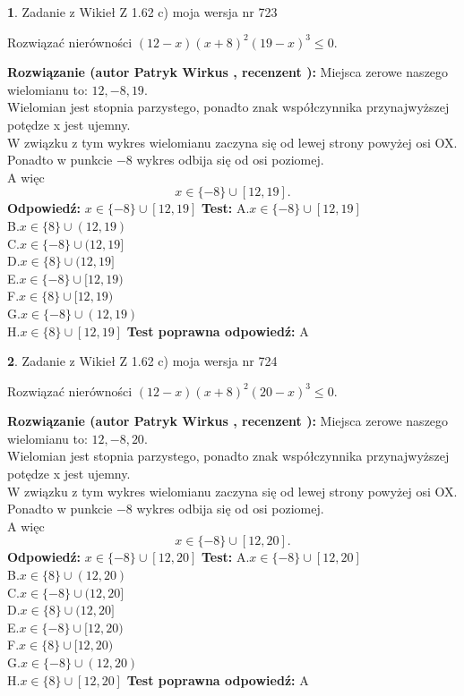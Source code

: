 \documentclass[12pt, a4paper]{article}
\theoremstyle{definition} %
\newtheorem{zad}{}
\newcommand{\zadStart}[1]{\begin{zad}#1\newline}
\newcommand{\zadStop}{\end{zad}}
\newcommand{\rozwStart}[2]{\noindent \textbf{Rozwiązanie (autor #1 , recenzent #2): }\newline}
\newcommand{\rozwStop}{\newline}
\newcommand{\odpStart}{\noindent \textbf{Odpowiedź:}\newline}
\newcommand{\odpStop}{\newline}
\newcommand{\testStart}{\noindent \textbf{Test:}\newline}
\newcommand{\testStop}{\newline}
\newcommand{\kluczStart}{\noindent \textbf{Test poprawna odpowiedź:}\newline}
\newcommand{\kluczStop}{\newline}
\begin{document}
\zadStart{Zadanie z Wikieł Z 1.62 c) moja wersja nr 723}

Rozwiązać nierówności $(12-x)(x+8)^{2}(19-x)^{3}\le0$.
\zadStop
\rozwStart{Patryk Wirkus}{}
Miejsca zerowe naszego wielomianu to: $12, -8, 19$.\\
Wielomian jest stopnia parzystego, ponadto znak współczynnika przy\linebreak najwyższej potędze x jest ujemny.\\ W związku z tym wykres wielomianu zaczyna się od lewej strony powyżej osi OX.\\
Ponadto w punkcie $-8$ wykres odbija się od osi poziomej.\\
A więc $$x \in \{-8\} \cup [12,19].$$
\rozwStop
\odpStart
$x \in \{-8\} \cup [12,19]$
\odpStop
\testStart
A.$x \in \{-8\} \cup [12,19]$\\
B.$x \in \{8\} \cup (12,19)$\\
C.$x \in \{-8\} \cup (12,19]$\\
D.$x \in \{8\} \cup (12,19]$\\
E.$x \in \{-8\} \cup [12,19)$\\
F.$x \in \{8\} \cup [12,19)$\\
G.$x \in \{-8\} \cup (12,19)$\\
H.$x \in \{8\} \cup [12,19]$
\testStop
\kluczStart
A
\kluczStop



\zadStart{Zadanie z Wikieł Z 1.62 c) moja wersja nr 724}

Rozwiązać nierówności $(12-x)(x+8)^{2}(20-x)^{3}\le0$.
\zadStop
\rozwStart{Patryk Wirkus}{}
Miejsca zerowe naszego wielomianu to: $12, -8, 20$.\\
Wielomian jest stopnia parzystego, ponadto znak współczynnika przy\linebreak najwyższej potędze x jest ujemny.\\ W związku z tym wykres wielomianu zaczyna się od lewej strony powyżej osi OX.\\
Ponadto w punkcie $-8$ wykres odbija się od osi poziomej.\\
A więc $$x \in \{-8\} \cup [12,20].$$
\rozwStop
\odpStart
$x \in \{-8\} \cup [12,20]$
\odpStop
\testStart
A.$x \in \{-8\} \cup [12,20]$\\
B.$x \in \{8\} \cup (12,20)$\\
C.$x \in \{-8\} \cup (12,20]$\\
D.$x \in \{8\} \cup (12,20]$\\
E.$x \in \{-8\} \cup [12,20)$\\
F.$x \in \{8\} \cup [12,20)$\\
G.$x \in \{-8\} \cup (12,20)$\\
H.$x \in \{8\} \cup [12,20]$
\testStop
\kluczStart
A
\kluczStop
\end{document}
